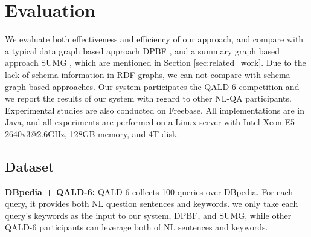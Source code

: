 \section{Evaluation}\label{sec:exp}

We evaluate both effectiveness and efficiency of our approach, and compare with a typical data graph based approach DPBF \cite{ding2007finding}, and a summary graph based approach SUMG \cite{tran2009top}, which are mentioned in Section \ref{sec:related_work}.
Due to the lack of schema information in RDF graphs, we can not compare with schema graph based approaches. Our system participates the QALD-6 competition and we report the results of our system with regard to other NL-QA participants. Experimental studies are also conducted on Freebase. All implementations are in Java, and all experiments are performed on a Linux server with Intel Xeon E5-2640v3@2.6GHz, 128GB memory, and 4T disk.

\vspace{-0.1in}
\subsection{Dataset}

\textbf{DBpedia + QALD-6:}
QALD-6 \cite{unger20166th} collects 100 queries over DBpedia.
For each query, it provides both NL question sentences and keywords.
we only take each query's keywords as the input to our system, DPBF, and SUMG, while other QALD-6 participants can leverage both of NL sentences and keywords.

